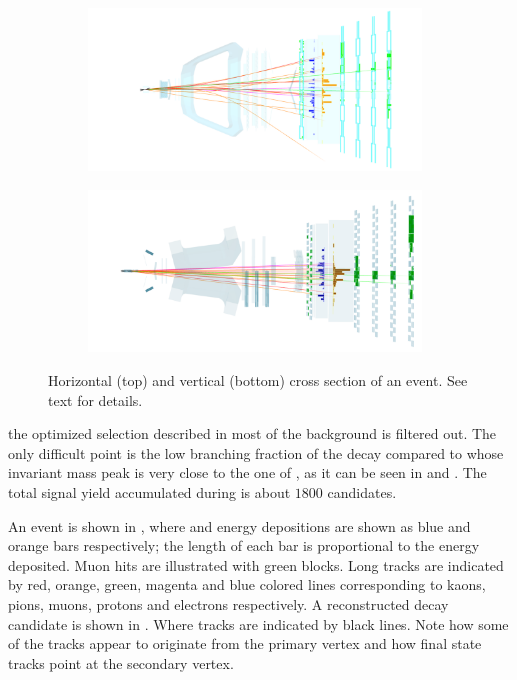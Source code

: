 \begin{figure}[!h]
  \centering
  \begin{subfigure}{\textwidth}
    \includegraphics[width=0.97\textwidth, trim=7cm 0cm 6cm 0cm, clip=true]{Figures/Chapter2/top}
    \label{det_evt_display_top}
  \end{subfigure}
  \begin{subfigure}{\textwidth}
    \includegraphics[width=0.97\textwidth, trim=5cm 0cm 3cm 0cm, clip=true]{Figures/Chapter2/side}
    \label{det_evt_display_side}
  \end{subfigure}
  \caption{Horizontal (top) and vertical (bottom) cross section of an \lhcb event. See text for details.}
  \label{det_evt_display}
\end{figure}


\noindent the optimized selection described in  most of the background
is filtered out. The only difficult point is the low branching fraction of the \BsJpsiKst decay
compared to \BdJpsiKst whose invariant mass peak is very close to the one of \BsJpsiKst, as it can
be seen in  and .
The total signal yield accumulated during \runone is about $1800$ \BsJpsiKst candidates.

An \lhcb event is shown in , where \ecal and \hcal energy depositions are
shown as blue and orange bars respectively; the length of each bar is proportional to the energy
deposited. Muon hits are illustrated with green blocks. Long tracks are indicated by red, orange,
green, magenta and blue colored lines corresponding to kaons, pions, muons, protons and electrons
respectively. A reconstructed \BsJpsiKst decay candidate is shown in .
Where \velo tracks are indicated by black lines. Note how some of the \velo tracks appear
to originate from the primary vertex and how \Bs final state tracks point at the secondary vertex.
